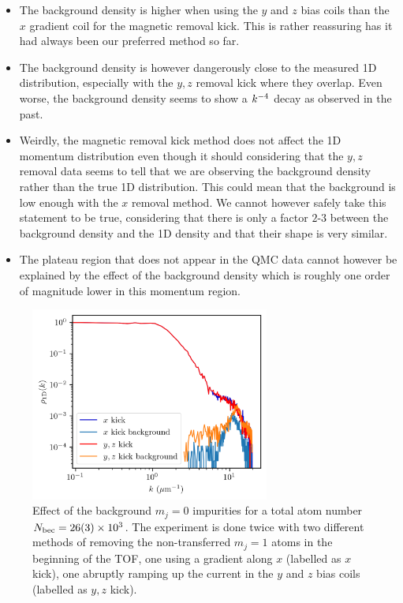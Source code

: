 \begin{itemize}
    \item The background density is higher when using the $y$ and $z$ bias coils than the $x$ gradient coil for the magnetic removal kick. This is rather reassuring has it had always been our preferred method so far.
    \item The background density is however dangerously close to the measured 1D distribution, especially with the $y,z$ removal kick where they overlap. Even worse, the background density seems to show a $k^{-4}$ decay as observed in the past.
    \item Weirdly, the magnetic removal kick method does not affect the 1D momentum distribution even though it should considering that the $y,z$ removal data seems to tell that we are observing the background density rather than the true 1D distribution. This could mean that the background is low enough with the $x$ removal method. We cannot however safely take this statement to be true, considering that there is only a factor $2$-$3$ between the background density and the 1D density and that their shape is very similar.
    \item The plateau region that does not appear in the QMC data cannot however be explained by the effect of the background density which is roughly one order of magnitude lower in this momentum region.
\end{itemize}

\begin{figure}
    \centering
    \includegraphics[width=0.7\textwidth]{Fig/Chapter5/1D_background_low.png}
    \caption{Effect of the background $m_j=0$ impurities for a total atom number $N_{\rm{bec}}=26(3) \times 10^3$. The experiment is done twice with two different methods of removing the non-transferred $m_j=1$ atoms in the beginning of the TOF, one using a gradient along $x$ (labelled as $x$ kick), one abruptly ramping up the current in the $y$ and $z$ bias coils (labelled as $y,z$ kick).}
    \label{fig:background_low_N}
\end{figure}

